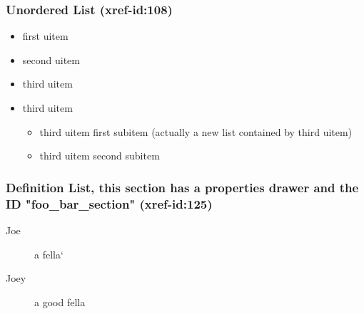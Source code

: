 \documentclass[11pt]{article}
\begin{document}
\subsubsection{Unordered List   (xref-id:108)  }
 \label{obj-108}
 \label{obj-107}
\begin{itemize}
\item
first uitem
\item
second uitem
\item
third uitem
\item
third uitem
\begin{itemize}
\item
third uitem first subitem (actually a new list contained by third uitem)
\item
third uitem second subitem
\end{itemize}
\end{itemize}
\subsubsection{Definition List, this section has a properties drawer and the ID "foo\_bar\_section"   (xref-id:125)  }
 \label{obj-125}
 \label{obj-124}
\begin{description}
\item[Joe]
a fella`
\item[Joey]
a good fella
\end{description}
\end{document}

